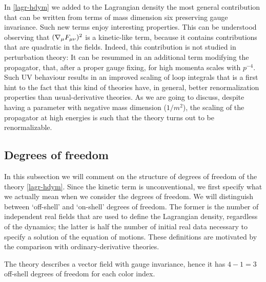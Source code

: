 In \eqref{lagr-hdym} we added to the \ym{} Lagrangian density the most general contribution that can be written from terms of mass dimension six  preserving gauge invariance.
Such new terms enjoy interesting properties. This can be understood observing that $({ \mathcal{\nabla} }_\mu F_{\mu\nu})^2$ is a kinetic-like term, because it contains contributions that are quadratic in the fields. Indeed, this contribution is not studied in perturbation theory: It can be resummed in an additional term modifying the propagator, that, after a proper gauge fixing, for high momenta scales with $p^{-4}$. Such UV behaviour results in an improved scaling of loop integrals that is a first hint to the fact that this kind of theories have, in general, better renormalization properties than usual-derivative theories.
%
As we are going to discuss, despite having a parameter with negative mass dimension (\ie $1/m^2$), the scaling of the propagator at high energies is such that the theory turns out to be renormalizable.








\subsection{Degrees of freedom}

In this subsection we will comment on the structure of degrees of freedom of the theory \eqref{lagr-hdym}. Since the kinetic term is unconventional, we first specify what we actually mean when we consider the degrees of freedom. We will distinguish between `off-shell' and `on-shell'  degrees of freedom. The former is the number of independent real fields that are used to define the Lagrangian density, regardless of the dynamics; the latter is half the number of initial real data necessary to specify a solution of the equation of motions. These definitions are motivated by the comparison with ordinary-derivative theories.




The theory describes a vector field with gauge invariance, hence it has $ 4 - 1= 3 $ off-shell degrees of freedom for each color index. 

